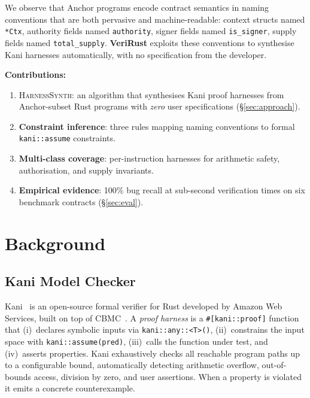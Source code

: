 \documentclass[sigconf,review,anonymous]{acmart}
\begin{document}
We observe that Anchor programs encode contract semantics in naming
conventions that are both pervasive and machine-readable:
context structs named \texttt{*Ctx}, authority fields named
\texttt{authority}, signer fields named \texttt{is\_signer},
supply fields named \texttt{total\_supply}.
\textbf{VeriRust} exploits these conventions to synthesise Kani
harnesses automatically, with no specification from the developer.

\smallskip\noindent\textbf{Contributions:}
\begin{enumerate}[leftmargin=*,noitemsep]
  \item \textsc{HarnessSynth}: an algorithm that synthesises Kani
        proof harnesses from Anchor-subset Rust programs with
        \emph{zero} user specifications (\S\ref{sec:approach}).
  \item \textbf{Constraint inference}: three rules mapping naming
        conventions to formal \texttt{kani::assume} constraints.
  \item \textbf{Multi-class coverage}: per-instruction harnesses for
        arithmetic safety, authorisation, and supply invariants.
  \item \textbf{Empirical evidence}: 100\% bug recall at sub-second
        verification times on six benchmark contracts (\S\ref{sec:eval}).
\end{enumerate}

\section{Background}
\label{sec:background}

\subsection{Kani Model Checker}

Kani~\cite{kani2022} is an open-source formal verifier for Rust
developed by Amazon Web Services, built on top of CBMC~\cite{cbmc}.
A \emph{proof harness} is a \texttt{\#[kani::proof]} function that
(i)~declares symbolic inputs via \texttt{kani::any::<T>()},
(ii)~constrains the input space with \texttt{kani::assume(pred)},
(iii)~calls the function under test, and (iv)~asserts properties.
Kani exhaustively checks all reachable program paths up to a
configurable bound, automatically detecting arithmetic overflow,
out-of-bounds access, division by zero, and user assertions.
When a property is violated it emits a concrete counterexample.
\end{document}
